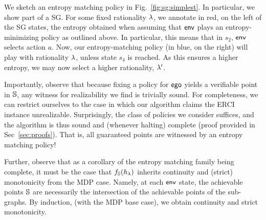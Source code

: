 \begin{example}
  We sketch an entropy matching policy in
  Fig.~\ref{fig:sg:simplest}. In particular, we show part of a SG. For
  some fixed rationality $\lambda$, we annotate in red, on the left of
  the SG states, the entropy obtained when assuming that $\mathsf{env}$ plays
  an entropy-minimizing policy as outlined above. In particular, this
  means that in $s_2$, $\mathsf{env}$ selects action $a$. Now, our
  entropy-matching policy (in blue, on the right) will play with
  rationality $\lambda$, unless state $s_4$ is reached. As this ensures a
  higher entropy, we may now select a higher rationality, $\lambda'$.
\end{example}

%

Importantly, observe that because
fixing a policy for $\mathsf{ego}$ yields a verifiable point in $\mathbb{S}$, any witness
for realizability we find is trivially sound. For completeness, we can
restrict ourselves to the case in which our algorithm claims the ERCI
instance unrealizable. Surprisingly, the class of policies we consider
suffices, and the algorithm is thus sound and (whenever halting)
complete (proof provided in Sec~\ref{sec:proofs}). That is, all
guaranteed points are witnessed by an entropy matching policy!

Further, observe that as a corollary of the entropy matching family
being complete, it must be the case that $f_\mathbb{S}(h_\lambda)$
inherits continuity and (strict) monotonicity from the MDP
case. Namely, at each $\mathsf{env}$ state, the achievable points
$\mathbb{S}$ are necessarily the intersection of the achievable points
of the sub-graphs. By induction, (with the MDP base case), we obtain
continuity and strict monotonicity.


